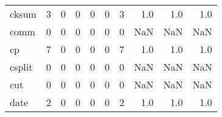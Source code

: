 \begin{longtable}{lrrrrrrrrr}
cksum     &                                                  3 &                                                  0 &                                                  0 &                                                  0 &                                                  0 &                                                  3 &                                                1.0 &                                    1.0 &                                  1.0 \\
comm      &                                                  0 &                                                  0 &                                                  0 &                                                  0 &                                                  0 &                                                  0 &                                                NaN &                                    NaN &                                  NaN \\
cp        &                                                  7 &                                                  0 &                                                  0 &                                                  0 &                                                  0 &                                                  7 &                                                1.0 &                                    1.0 &                                  1.0 \\
csplit    &                                                  0 &                                                  0 &                                                  0 &                                                  0 &                                                  0 &                                                  0 &                                                NaN &                                    NaN &                                  NaN \\
cut       &                                                  0 &                                                  0 &                                                  0 &                                                  0 &                                                  0 &                                                  0 &                                                NaN &                                    NaN &                                  NaN \\
date      &                                                  2 &                                                  0 &                                                  0 &                                                  0 &                                                  0 &                                                  2 &                                                1.0 &                                    1.0 &                                  1.0 \\

\end{longtable}
